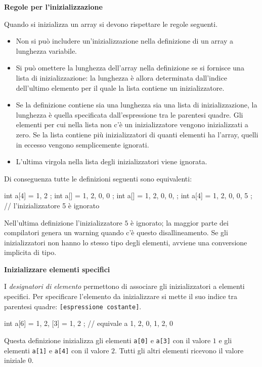 \documentclass[11pt,a4paper]{article}
\begin{document}
\medskip\noindent\textbf{Regole per l'inizializzazione}\par\nopagebreak

Quando si inizializza un array si devono rispettare le regole seguenti.
\begin{itemize}
    \item Non si può includere un'inizializzazione nella definizione di un array a lunghezza variabile.
    \item Si può omettere la lunghezza dell'array nella definizione se si fornisce una lista di inizializzazione: la lunghezza è allora determinata dall'indice dell'ultimo elemento per il quale la lista contiene un inizializzatore.
    \item Se la definizione contiene sia una lunghezza sia una lista di inizializzazione, la lunghezza è quella specificata dall'espressione tra le parentesi quadre. Gli elementi per cui nella lista non c'è un inizializzatore vengono inizializzati a zero. Se la lista contiene più inizializzatori di quanti elementi ha l'array, quelli in eccesso vengono semplicemente ignorati.
    \item L'ultima virgola nella lista degli inizializzatori viene ignorata.
\end{itemize}

Di conseguenza tutte le definizioni seguenti sono equivalenti:
\begin{codice}
int a[4] = { 1, 2 };
int a[]  = { 1, 2, 0, 0 };
int a[]  = { 1, 2, 0, 0, };
int a[4] = { 1, 2, 0, 0, 5 };    // l'inizializzatore 5 è ignorato
\end{codice}
Nell'ultima definizione l'inizializzatore $5$ è ignorato; la maggior parte dei compilatori genera un warning quando c'è questo disallineamento. Se gli inizializzatori non hanno lo stesso tipo degli elementi, avviene una conversione implicita di tipo.

\medskip\noindent\textbf{Inizializzare elementi specifici}\par\nopagebreak

I \emph{designatori di elemento} permettono di associare gli inizializzatori a elementi specifici. Per specificare l'elemento da inizializzare si mette il suo indice tra parentesi quadre: \texttt{[espressione costante]}.
\begin{codice}
int a[6] = { 1, 2, [3] = 1, 2 };   // equivale a { 1, 2, 0, 1, 2, 0 }
\end{codice}
Questa definizione inizializza gli elementi \lstinline|a[0]| e \lstinline|a[3]| con il valore $1$ e gli elementi \lstinline|a[1]| e \lstinline|a[4]| con il valore $2$. Tutti gli altri elementi ricevono il valore iniziale $0$.
\end{document}
